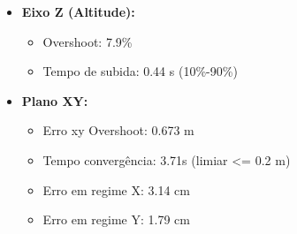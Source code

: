 \begin{itemize}
  \item \textbf{Eixo Z (Altitude):}
  \begin{itemize}
    \item Overshoot: 7.9\%
    \item Tempo de subida: 0.44 s (10\%-90\%)
  \end{itemize}
  \item \textbf{Plano XY:}
  \begin{itemize}
    \item Erro xy Overshoot: 0.673 m
    \item Tempo convergência: 3.71s (limiar <= 0.2 m)
    \item Erro em regime X: 3.14 cm
    \item Erro em regime Y: 1.79 cm
  \end{itemize}
\end{itemize}
